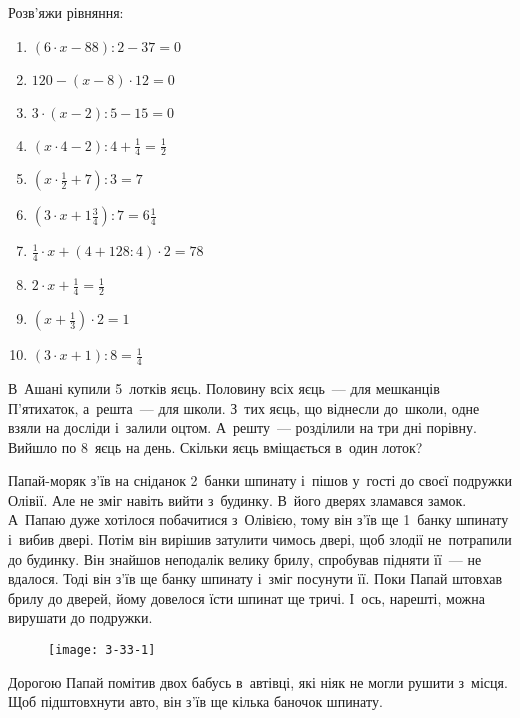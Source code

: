 \problem
Розв’яжи рівняння:
\begin{multicols}{2}
    \begin{enumerate}
        \item $(6 \cdot x - 88) : 2 - 37 = 0$
        \item $120 - (x - 8) \cdot 12 = 0$
        \item $3 \cdot (x - 2) : 5 - 15 = 0$
        \item $(x \cdot 4 - 2) : 4 + \frac{1}{4} = \frac{1}{2}$
        \item $(x \cdot \frac{1}{2} + 7) : 3 = 7$
        \item $(3 \cdot x + 1\frac{3}{4}) : 7 = 6\frac{1}{4}$
        \item $\frac{1}{4} \cdot x + (4 + 128 : 4) \cdot 2 = 78$
        \item $2 \cdot x + \frac{1}{4} = \frac{1}{2}$
        \item $(x + \frac{1}{3}) \cdot 2 = 1$
        \item $(3 \cdot x + 1) : 8 = \frac{1}{4}$
    \end{enumerate}
\end{multicols}


\problem
В~Ашані купили 5~лотків яєць.
Половину всіх яєць~--- для мешканців П'ятихаток, а~решта~--- для школи.
З~тих яєць, що віднесли до~школи, одне взяли на досліди і~залили оцтом.
А~решту~--- розділили на три дні порівну. Вийшло по 8~яєць на день.
Скільки яєць вміщається в~один лоток? 


\problem
Папай-моряк з’їв на сніданок 2~банки шпинату і~пішов у~гості до своєї
подружки Олівії. Але не зміг навіть вийти з~будинку. В~його дверях
зламався замок. А~Папаю дуже хотілося побачитися з~Олівією, тому він
з’їв ще 1~банку шпинату і~вибив двері. Потім він вирішив затулити
чимось двері, щоб злодії не~потрапили до будинку. Він знайшов неподалік
велику брилу, спробував підняти її~--- не вдалося. Тоді він з’їв ще банку
шпинату і~зміг посунути її. Поки Папай штовхав брилу до дверей, йому
довелося їсти шпинат ще тричі. І~ось, нарешті, можна вирушати до подружки.

\begin{wrapfigure}{l}{0.4\textwidth}
    \begin{center}
        \texttt{[image: 3-33-1]}
    \end{center}
\end{wrapfigure}

Дорогою Папай помітив двох бабусь в~автівці, які ніяк не могли рушити
з~місця. Щоб підштовхнути авто, він з’їв ще кілька баночок шпинату.

